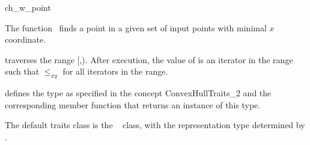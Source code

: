 

\begin{ccRefFunction}{ch_w_point}  %

\ccDefinition
  
The function \ccRefName\ finds a point in a given set  
of input points with minimal $x$ coordinate.


           {traverses the range [,).
            After execution, the value of
             is an iterator in the range such that  $\le_{xy}$
             for all iterators  in the range.}


 defines the type  as specified in
the concept ConvexHullTraits\_2 and the corresponding member
function that returns an instance of this type.


The default traits class  is the \cgal\ 
 class,
with the representation type determined by .


\ccSeeAlso

 \\
 \\
 \\
 \\
 \\

\end{ccRefFunction}


